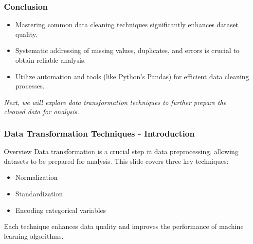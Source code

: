 \documentclass[aspectratio=169]{beamer}
\begin{document}
\begin{frame}[fragile]
    \frametitle{Conclusion}
    \begin{itemize}
        \item Mastering common data cleaning techniques significantly enhances dataset quality.
        \item Systematic addressing of missing values, duplicates, and errors is crucial to obtain reliable analysis.
        \item Utilize automation and tools (like Python's Pandas) for efficient data cleaning processes.
    \end{itemize}
    \textit{Next, we will explore data transformation techniques to further prepare the cleaned data for analysis.}
\end{frame}

\begin{frame}[fragile]
    \frametitle{Data Transformation Techniques - Introduction}
    \begin{block}{Overview}
        Data transformation is a crucial step in data preprocessing, allowing datasets to be prepared for analysis. This slide covers three key techniques:
    \end{block}
    
    \begin{itemize}
        \item Normalization
        \item Standardization
        \item Encoding categorical variables
    \end{itemize}
    
    Each technique enhances data quality and improves the performance of machine learning algorithms.
\end{frame}
\end{document}
